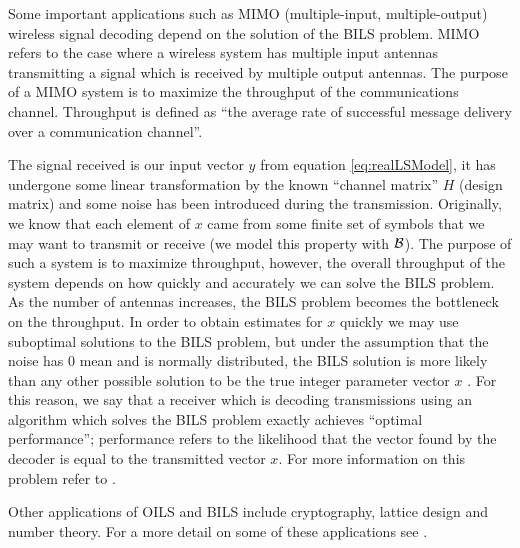 \documentclass[12pt,Bold,letterpaper]{mcgilletdclass}
\newcommand{\boxcon}{{\cal B}}
\begin{document}
Some important applications such as MIMO (multiple-input, multiple-output) wireless signal decoding depend on the
solution of the BILS problem. MIMO refers to the case where a wireless system has multiple
input antennas transmitting a signal which is received by multiple output
antennas. The purpose of a MIMO system is to maximize the throughput of the communications channel. Throughput is defined as ``the average rate of successful message delivery over a communication channel''. 

The signal received is our input vector $y$ from
equation \eqref{eq:realLSModel}, it has undergone some linear transformation by the known
``channel matrix'' $H$ (design matrix) and some noise has been introduced during
the transmission. Originally, we know that each element of $x$ came from some
finite set of symbols that we may want to transmit or receive (we model
this property with $\boxcon$). The purpose of such a system is to maximize
throughput, however, the overall throughput of the system depends on how
quickly and accurately we can solve the BILS problem. As the number of antennas increases, the BILS problem becomes the bottleneck on the throughput. In order to obtain estimates for $x$ quickly we may use suboptimal solutions to the BILS problem, but under the assumption that the noise has $0$ mean and is
normally distributed, the BILS solution is more likely than any other possible
solution to be the true integer parameter vector $x$ \cite{Han11}. For this reason, we say that a receiver which is decoding transmissions using an algorithm which solves the BILS problem exactly achieves ``optimal performance''; performance refers to the likelihood that the vector found by the decoder is equal to the transmitted vector $x$. For more information on this problem refer to \cite{Jan04}.

Other applications of OILS and BILS include cryptography, lattice design and number theory. For a more detail on some of these applications see \cite{HanPS11}.
\end{document}
